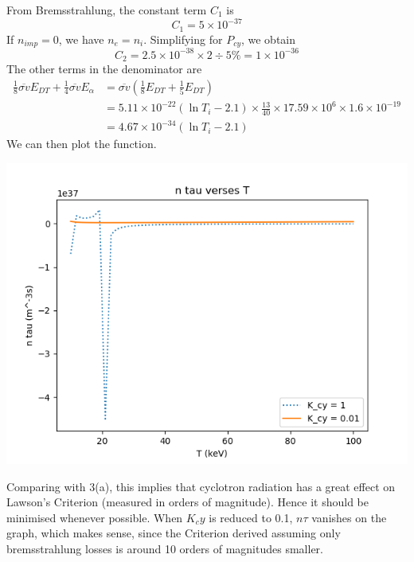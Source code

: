 \documentclass[answers]{exam}
\begin{document}
\begin{questions}
\begin{parts}
\begin{solution}
    From Bremsstrahlung, the constant term $C_1$ is
    $$C_1 = 5 \times 10^{-37}$$
    If $n_{imp} = 0$, we have $n_e = n_i$. Simplifying for $P_{cy}$, we obtain
    $$C_2 = 2.5 \times 10^{-38} \times 2 \div 5\% = 1 \times 10^{-36}$$
    The other terms in the denominator are
    \begin{align*}
        \frac{1}{8}\overline{\sigma v}E_{DT} + \frac{1}{4} \overline{\sigma v}E_\alpha &= \overline{\sigma v} (\frac{1}{8} E_{DT} + \frac{1}{5} E_{DT}) \\
                                                                                       &= 5.11 \times 10^{-22} (\ln T_i - 2.1) \times \frac{13}{40} \times 17.59 \times 10^6 \times 1.6 \times 10^{-19} \\
                                                                                       &= 4.67 \times 10^{-34} (\ln T_i - 2.1)
    \end{align*}
    We can then plot the function.
    \begin{center}
    \includegraphics{q3d.png}
    \end{center}
    Comparing with 3(a), this implies that cyclotron radiation has a great effect on Lawson's Criterion (measured in orders of magnitude). Hence it should be minimised whenever possible. When $K_cy$ is reduced to 0.1, $n\tau$ vanishes on the graph, which makes sense, since the Criterion derived assuming only bremsstrahlung losses is around 10 orders of magnitudes smaller.
\end{solution}
\end{parts}


\end{questions}
\end{document}
